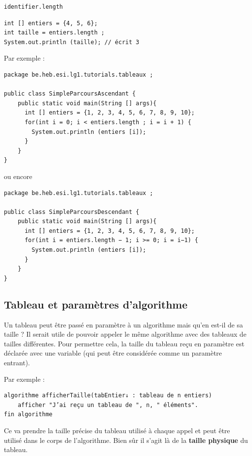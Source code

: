 \documentclass[11pt,a4paper]{article}
\begin{document}
            \par
        \begin{verbatim}
identifier.length
      \end{verbatim}\begin{verbatim}
int [] entiers = {4, 5, 6};
int taille = entiers.length ;
System.out.println (taille); // écrit 3
      \end{verbatim}Par exemple : 
            \par
        \begin{verbatim}
package be.heb.esi.lg1.tutorials.tableaux ;

public class SimpleParcoursAscendant {
    public static void main(String [] args){
      int [] entiers = {1, 2, 3, 4, 5, 6, 7, 8, 9, 10};
      for(int i = 0; i < entiers.length ; i = i + 1) {
        System.out.println (entiers [i]);
      }
    }
}
      \end{verbatim}ou encore
            \par
        \begin{verbatim}
package be.heb.esi.lg1.tutorials.tableaux ;

public class SimpleParcoursDescendant {
    public static void main(String [] args){
      int [] entiers = {1, 2, 3, 4, 5, 6, 7, 8, 9, 10};
      for(int i = entiers.length − 1; i >= 0; i = i−1) {
        System.out.println (entiers [i]);
      }
    }
}
      \end{verbatim}\subsection{Tableau et param\`etres d'algorithme}
		    Un tableau peut \^etre pass\'e en param\`etre \`a un algorithme mais qu'en est-il de sa taille ? Il
        serait utile de pouvoir appeler le m\^eme algorithme avec des tableaux de tailles diff\'erentes. Pour
        permettre cela, la taille du tableau re\c cu en param\`etre est d\'eclar\'ee avec une variable (qui
        peut \^etre consid\'er\'ee comme un param\`etre entrant).
		  
            \par
        
		    Par exemple :
		  
            \par
        \begin{verbatim}
algorithme afficherTaille(tabEntier↓ : tableau de n entiers)
    afficher "J’ai reçu un tableau de ", n, " éléments".
fin algorithme
      \end{verbatim}
        Ce \verb@n@ va prendre la taille pr\'ecise du tableau utilis\'e \`a chaque appel
        et peut \^etre utilis\'e dans le corps de l'algorithme. Bien s\^ur il s'agit l\`a de la 
        \textbf{taille physique} du tableau. 
      
\end{document}
